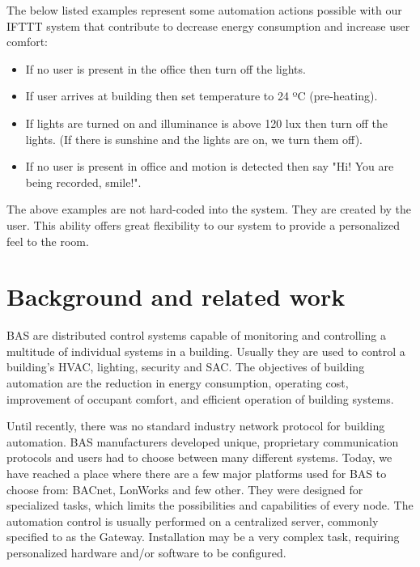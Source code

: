 \documentclass[conference]{IEEEtran}
\begin{document}
The below listed examples represent some automation actions possible with our \ac{IFTTT} system that contribute to decrease energy consumption and increase user comfort:

\begin{itemize}
\item If no user is present in the office then turn off the lights.
\item If user arrives at building then set temperature to 24 ºC (pre-heating). 
\item If lights are turned on and illuminance is above 120 lux then turn off the lights. (If there is  sunshine and the lights are on, we turn them off).
\item If no user is present in office and motion is detected then say "Hi! You are being recorded, smile!".
\end{itemize}

The above examples are not hard-coded into the system. They are created by the user. This ability offers great flexibility to our system to provide a personalized feel to the room.




\section{Background and related work}
\label{rel}

\ac{BAS} are distributed control systems capable of monitoring and controlling a multitude of individual systems in a building. Usually they are used to control a building's \ac{HVAC}, lighting, security and \ac{SAC}.
The objectives of building automation are the reduction in energy consumption, operating cost, improvement of occupant comfort, and efficient operation of building systems.



Until recently, there was no standard industry network protocol for building automation. \ac{BAS} manufacturers developed unique, proprietary communication protocols and users had to choose between many different systems. Today, we have reached a place where there are a few major platforms used for \ac{BAS} to choose from: BACnet\cite{livro_automation,bacnet:artigo1,bacnet:bib,livro_automation2}, LonWorks\cite{livro_automation2,livro_automation} and few other. 
They were designed for specialized tasks, which limits the possibilities and capabilities of every node. The automation control is usually performed on a
centralized server, commonly specified to as the Gateway. Installation may be a very complex task, requiring personalized hardware and/or software to be configured.
\end{document}
